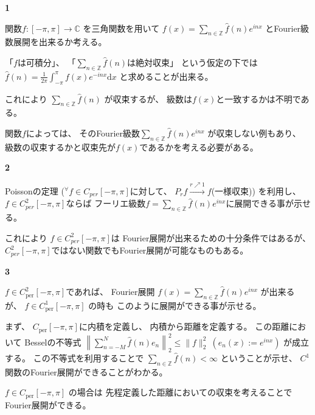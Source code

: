 \documentclass[12pt,b5paper]{ltjsarticle}
\begin{document}
\hrulefill
\textbf{1}
\hrulefill

関数$f:[-\pi,\pi]\to\mathbb{C}$
を三角関数を用いて
$\displaystyle f(x)=\sum_{n\in\mathbb{Z}} \widehat{f}(n)e^{inx}$
とFourier級数展開を出来るか考える。

「$f$は可積分」、
「$\displaystyle \sum_{n\in\mathbb{Z}}\widehat{f}(n)$は絶対収束」
という仮定の下では
$\displaystyle \widehat{f}(n) = \frac{1}{2\pi}\int_{-\pi}^{\pi}f(x)e^{-inx}\mathrm{d}x$
と求めることが出来る。

これにより
$\displaystyle \sum_{n\in\mathbb{Z}}\widehat{f}(n)$
が収束するが、
級数は$f(x)$と一致するかは不明である。

関数$f$によっては、
そのFourier級数$\displaystyle \sum_{n\in\mathbb{Z}} \widehat{f}(n)e^{inx}$
が収束しない例もあり、
級数の収束するかと収束先が$f(x)$であるかを考える必要がある。

\hrulefill



\hrulefill
\textbf{2}
\hrulefill

Poissonの定理
(${}^{\forall}f\in C_{per}[-\pi,\pi]$に対して、
$P_{r}f \overset{r \nearrow 1}{\longrightarrow} f$(一様収束))
を利用し、
$f\in C^{2}_{per}[-\pi,\pi]$ならば
フーリエ級数$f=\sum_{n\in\mathbb{Z}}\hat{f}(n)e^{inx}$に展開できる事が示せる。

これにより
$f\in C^{2}_{per}[-\pi,\pi]$は
Fourier展開が出来るための十分条件ではあるが、
$C^{2}_{per}[-\pi,\pi]$ではない関数でもFourier展開が可能なものもある。

\hrulefill


\hrulefill
\textbf{3}
\hrulefill

$f\in C^{2}_{\mathrm{per}}[-\pi,\pi]$であれば、
Fourier展開
$\displaystyle f(x)=\sum_{n\in\mathbb{Z}} \widehat{f}(n)e^{inx}$
が出来るが、
$f\in C^{1}_{\mathrm{per}}[-\pi,\pi]$
の時も
このように展開ができる事が示せる。

まず、
$C_{\mathrm{per}}[-\pi,\pi]$に内積を定義し、
内積から距離を定義する。
%
この距離において
Besselの不等式
$\displaystyle \left\| \sum_{n=-M}^{N} \hat{f}(n)e_{n} \right\|^{2}_{2} \leq \|f\|^{2}_{2} \  (e_{n}(x) := e^{inx})$
が成立する。
この不等式を利用することで
$\displaystyle \sum_{n\in \mathbb{Z}} \hat{f}(n) < \infty$
ということが示せ、
$C^{1}$関数のFourier展開ができることがわかる。

$f\in C_{\mathrm{per}}[-\pi,\pi]$
の場合は
先程定義した距離においての収束を考えることで
Fourier展開ができる。
\end{document}
